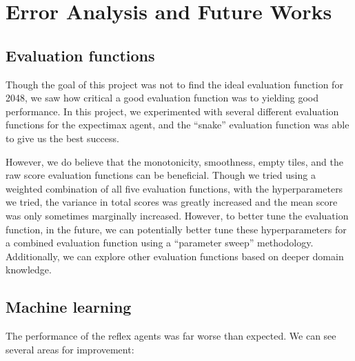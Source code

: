 \documentclass[9pt,twocolumn]{article}
\begin{document}
\section{Error Analysis and Future Works}

\subsection{Evaluation functions}

Though the goal of this project was not to find the ideal evaluation function for 2048, we saw how critical a good evaluation function was to yielding good performance. In this project, we experimented with several different evaluation functions for the expectimax agent, and the “snake” evaluation function was able to give us the best success.

However, we do believe that the monotonicity, smoothness, empty tiles, and the raw score evaluation functions can be beneficial. Though we tried using a weighted combination of all five evaluation functions, with the hyperparameters we tried, the variance in total scores was greatly increased and the mean score was only sometimes marginally increased. However, to better tune the evaluation function, in the future, we can potentially better tune these hyperparameters for a combined evaluation function using a “parameter sweep” methodology. Additionally, we can explore other evaluation functions based on deeper domain knowledge.

\subsection{Machine learning}

The performance of the reflex agents was far worse than expected. We can see several areas for improvement:
\end{document}

